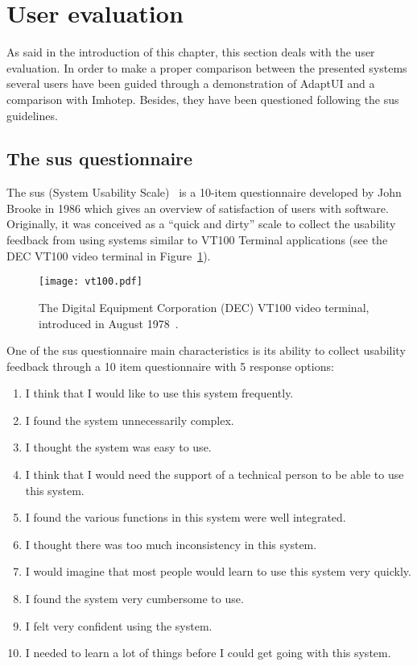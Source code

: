 \section{User evaluation}
\label{sec:user_evaluation}

As said in the introduction of this chapter, this section deals with the user 
evaluation. In order to make a proper comparison between the presented systems 
several users have been guided through a demonstration of AdaptUI and a 
comparison with Imhotep. Besides, they have been questioned following the \ac{sus} 
guidelines.

\subsection{The \ac{sus} questionnaire}
\label{sec:sus}
The \ac{sus} (System Usability Scale)~\citep{sus} is a 10-item questionnaire 
developed by John Brooke in 1986 which gives an overview of satisfaction of 
users with software. Originally, it was conceived as a ``quick and dirty'' 
scale to collect the usability feedback from using systems similar to VT100 
Terminal applications (see the DEC VT100 video terminal in 
Figure~\ref{fig:vt100}).

\begin{figure}
\centering
\texttt{[image: vt100.pdf]}
\caption{The Digital Equipment Corporation (DEC) VT100 video terminal, 
introduced in August 1978~\citep{vt100}.}
\label{fig:vt100}
\end{figure}

One of the \ac{sus} questionnaire main characteristics is its ability to collect
usability feedback through a 10 item questionnaire with 5 response options: 

\begin{enumerate}
 \item I think that I would like to use this system frequently.
 \item I found the system unnecessarily complex.
 \item I thought the system was easy to use.
 \item I think that I would need the support of a technical person to be able to
 use this system.
 \item I found the various functions in this system were well integrated.
 \item I thought there was too much inconsistency in this system.
 \item I would imagine that most people would learn to use this system very
 quickly.
 \item I found the system very cumbersome to use.
 \item I felt very confident using the system.
 \item I needed to learn a lot of things before I could get going with this
 system.
\end{enumerate}

